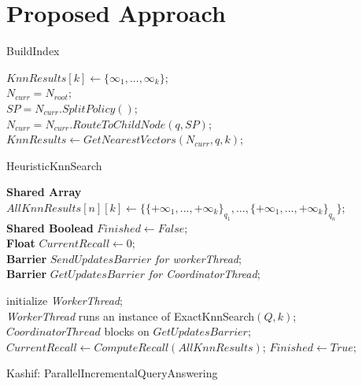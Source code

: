 \section{Proposed Approach}
\label{sec:system-architecture}

\small
\begin{algorithm}
	\DontPrintSemicolon
	\caption{{\sc BuildIndex}}
	\label{algo:build_index}
\end{algorithm}

\small
\begin{algorithm}
	\DontPrintSemicolon
	\vspace{.2cm}
	$KnnResults[k] \gets \{\infty_{1}, ..., \infty_{k}\}$;\\
	$N_{curr} = N_{root}$;\\
	\vspace{.2cm}
	{
		$SP = N_{curr}.SplitPolicy()$;\\
		$N_{curr} = N_{curr}.RouteToChildNode(q, SP)$;\\
		
	}
	$KnnResults \gets GetNearestVectors(N_{curr}, q, k)$;\\
	\caption{{\sc HeuristicKnnSearch}}
	\label{algo:heuristic_knn_search}
\end{algorithm}


\small
\begin{algorithm}
	\DontPrintSemicolon %
	\vspace{.2cm}
	\textbf{Shared Array} $AllKnnResults[n][k] \gets \{\{+\infty_{1}, ..., +\infty_{k}\}_{q_{1}}, ..., \{+\infty_{1}, ..., +\infty_{k}\}_{q_{n}}\}$;\\
	\textbf{Shared Boolead} $Finished \gets False$;\\
	\textbf{Float} $CurrentRecall \gets 0$;\\
	\textbf{Barrier} $SendUpdatesBarrier$ {\it for workerThread};\\
	\textbf{Barrier} $GetUpdatesBarrier$ {\it for CoordinatorThread};\\
	
	\vspace{.2cm}
	
	
	initialize {\it WorkerThread};\\
	{\it WorkerThread} runs an instance of {\sc ExactKnnSearch$(Q, k)$};\\
	{ 
		$CoordinatorThread$ blocks on $GetUpdatesBarrier$;\\
		$CurrentRecall \gets ComputeRecall(AllKnnResults)$;
	}
	$Finished \gets True$;\\
	\caption{{\sc Kashif: ParallelIncrementalQueryAnswering}}
	\label{algo:query_answering}
\end{algorithm}


